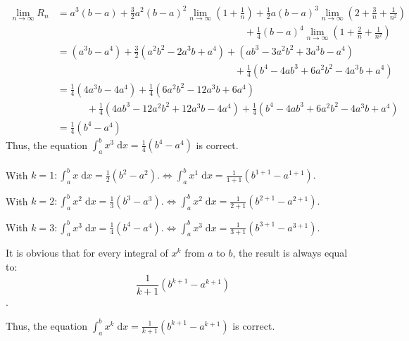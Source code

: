 \documentclass[12pt]{article}
\begin{document}
\begin{enumerate}
\begin{align*}
    \lim_{n\to\infty}R_n &=a^3\left(b-a\right)
    + \frac{3}{2} a^2\left(b-a\right)^2 \lim_{n\to\infty}\left(1+\frac{1}{n}\right)
    + \frac{1}{2} a\left(b-a\right)^3 \lim_{n\to\infty}\left(2+ \frac{3}{n}+ \frac{1}{n^2} \right)\\
    &\qquad\qquad\qquad\qquad\qquad\qquad\qquad\qquad
    \qquad\quad
    +\frac{1}{4} \left(b-a\right)^4 \lim_{n\to\infty} \left(1+ \frac{2}{n}+ \frac{1}{n^2} \right)\\
    &=\left(a^3b-a^4\right) 
    + \frac{3}{2} \left(a^2b^2-2a^3b+a^4\right)
    + \left(ab^3-3a^2b^2+3a^3b-a^4\right) \\
    &\qquad\qquad\qquad\qquad\qquad\qquad\qquad\qquad
    \qquad
    + \frac{1}{4} \left(b^4-4ab^3+6a^2b^2-4a^3b+a^4 \right) \\
    &= \frac{1}{4} \left(4a^3b-4a^4\right)
    + \frac{1}{4} \left(6a^2b^2-12a^3b+6a^4\right)\\
    &\qquad\quad
    + \frac{1}{4} \left(4ab^3-12a^2b^2+12a^3b-4a^4\right)
    + \frac{1}{4} \left(b^4-4ab^3+6a^2b^2-4a^3b+a^4 \right) \\
    &=\frac{1}{4} \left(b^4-a^4 \right)
\end{align*}
    Thus, the equation $\int_{a}^b x^3 \; \mathrm{d}x= \frac{1}{4} \left(b^4-a^4 \right)$ is correct.\paragraph{}
\end{enumerate}

\newpage

 \par
With $k=1: \int_{a}^b x \; \mathrm{d}x = \frac{1}{2}(b^{2}-a^{2}).
\Longleftrightarrow \int_{a}^b x^1 \; \mathrm{d}x = \frac{1}{1+1}(b^{1+1}-a^{1+1}).$ \par
With $k=2: \int_{a}^b x^2 \; \mathrm{d}x = \frac{1}{3}(b^{3}-a^{3}).
\Longleftrightarrow \int_{a}^b x^2 \; \mathrm{d}x = \frac{1}{2+1}(b^{2+1}-a^{2+1}).$ \par
With $k=3: \int_{a}^b x^3 \; \mathrm{d}x = \frac{1}{4}(b^{4}-a^{4}).
\Longleftrightarrow \int_{a}^b x^3 \; \mathrm{d}x = \frac{1}{3+1}(b^{3+1}-a^{3+1}).$ \par
It is obvious that for every integral of $x^k$ from $a$ to $b$, the result is always equal to: $$\frac{1}{k+1} \left(b^{k+1}-a^{k+1} \right)$$. \par

Thus, the equation $\int_{a}^b x^k \; \mathrm{d}x= \frac{1}{k+1} \left(b^{k+1}-a^{k+1} \right)$ is correct.
\end{document}
